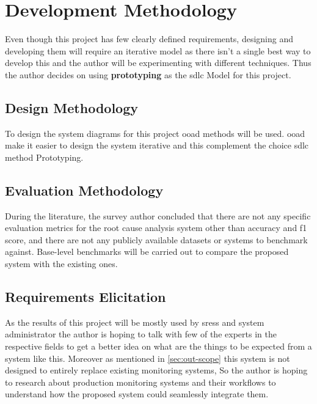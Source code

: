 
{\let\clearpage\relax \chapter{Development Methodology}}

Even though this project has few clearly defined requirements, designing and developing them will require an iterative model as there isn't a single best way to develop this and the author will be experimenting with different techniques. Thus the author decides on using \textbf{prototyping} as the \ac{sdlc} Model for this project.\\

\section{Design Methodology}

To design the system diagrams for this project \ac{ooad} methods will be used. \ac{ooad} make it easier to design the system iterative and this complement the choice \ac{sdlc} method Prototyping.

\section{Evaluation Methodology}

During the literature, the survey author concluded that there are not any specific evaluation metrics for the root cause analysis system other than accuracy and f1 score, and there are not any publicly available datasets or systems to benchmark against. Base-level benchmarks will be carried out to compare the proposed system with the existing ones. 

\section{Requirements Elicitation}

As the results of this project will be mostly used by \acp{sres} and system administrator the author is hoping to talk with few of the experts in the respective fields to get a better idea on what are the things to be expected from a system like this. Moreover as mentioned in \ref{sec:out-scope} this system is not designed to entirely replace existing monitoring systems, So the author is hoping to research about production monitoring systems and their workflows to understand how the proposed system could seamlessly integrate them. 
